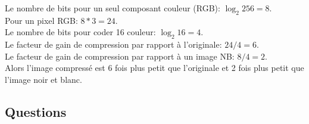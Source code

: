 \documentclass{article}
\begin{document}
\vspace{2mm}
\subsubsection{ }
Le nombre de bits pour un seul composant couleur (RGB): $\log_2{256} = 8$.\\
Pour un pixel RGB: $8 * 3 = 24$.\\
Le nombre de bits pour coder 16 couleur: $\log_2{16} = 4$.\\
Le facteur de gain de compression par rapport à l'originale: $24 / 4 = 6$.\\
Le facteur de gain de compression par rapport à un image NB: $8 / 4 = 2$.\\
Alors l'image compressé est 6 fois plus petit que l'originale et 2 fois plus
petit que l'image noir et blanc.

\subsection{Questions}
\subsubsection{ }

\subsubsection{ }

\subsubsection{ }
\end{document}
